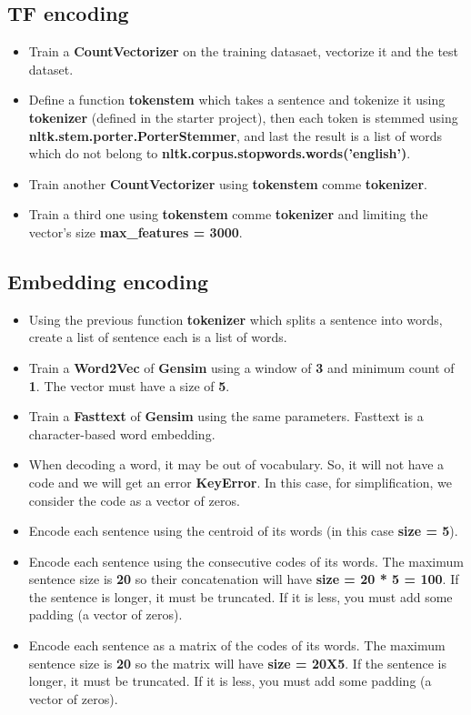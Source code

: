 \documentclass[11pt, a4paper]{article}
\begin{document}
\subsection{TF encoding}

\begin{itemize}
	\item Train a \textbf{CountVectorizer} on the training datasaet, vectorize it and the test dataset. 
	\item Define a function \textbf{tokenstem} which takes a sentence and tokenize it using \textbf{tokenizer} (defined in the starter project), then each token is stemmed using \textbf{nltk.stem.porter.PorterStemmer}, and last the result is a list of words which do not belong to \textbf{nltk.corpus.stopwords.words('english')}.
	\item Train another \textbf{CountVectorizer} using  \textbf{tokenstem} comme \textbf{tokenizer}. 
	\item Train a third one using  \textbf{tokenstem} comme \textbf{tokenizer} and limiting the vector's size \textbf{max\_features = 3000}.
\end{itemize}

\subsection{Embedding encoding}

\begin{itemize}
	\item Using the previous function \textbf{tokenizer} which splits a sentence into words, create a list of sentence each is a list of words.	
	\item Train a \textbf{Word2Vec} of \textbf{Gensim} using a window of \textbf{3} and minimum count of \textbf{1}.
	The vector must have a size of \textbf{5}.
	\item Train a \textbf{Fasttext} of \textbf{Gensim} using the same parameters. Fasttext is a character-based word embedding.
	\item When decoding a word, it may be out of vocabulary. So, it will not have a code and we will get an error \textbf{KeyError}.
	In this case, for simplification, we consider the code as a vector of zeros.
	\item Encode each sentence using the centroid of its words (in this case \textbf{size = 5}).
	\item Encode each sentence using the consecutive codes of its words. 
	The maximum sentence size is \textbf{20} so their concatenation will have \textbf{size = 20 * 5 = 100}. 
	If the sentence is longer, it must be truncated.
	If it is less, you must add some padding (a vector of zeros).
	\item Encode each sentence as a matrix of the codes of its words.
	The maximum sentence size is \textbf{20} so the matrix will have \textbf{size = 20X5}.
	If the sentence is longer, it must be truncated.
	If it is less, you must add some padding (a vector of zeros).
\end{itemize}
\end{document}
